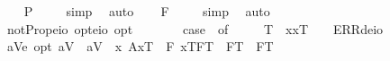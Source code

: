 \begin{isabellebody}
\ \isamarkupfalse%
\ {\isachardoublequoteopen}{\isacharbrackleft}{\isacharparenleft}\isactrlbold {\isasymexists}{\isasymphi}{\isachardot}\ {\isasymphi}\isactrlsup P{\isacharparenright}{\isacharbrackright}\ {\isacharequal}\ {\isasymtop}{\isachardoublequoteclose}%
\isadelimproof
\ %
\endisadelimproof
%
\isatagproof
{}\isamarkupfalse%
\ simp\ \isamarkupfalse%
\ auto%
\endisatagproof
{\isafoldproof}%
%
\isadelimproof
%
\endisadelimproof
\isanewline
\ \isamarkupfalse%
\ {\isachardoublequoteopen}{\isacharbrackleft}{\isacharparenleft}\isactrlbold {\isasymexists}{\isasymphi}{\isachardot}\ {\isasymphi}\isactrlsup F{\isacharparenright}{\isacharbrackright}\ {\isacharequal}\ {\isasymtop}{\isachardoublequoteclose}%
\isadelimproof
\ %
\endisadelimproof
%
\isatagproof
{}\isamarkupfalse%
\ simp\ \isamarkupfalse%
\ auto%
\endisatagproof
{\isafoldproof}%
%
\isadelimproof
%
\endisadelimproof
%
\isamarkuptrue%
\ \isamarkupfalse%
\ notProp{\isacharcolon}{\isacharcolon}{\isachardoublequoteopen}{\isacharparenleft}{\isacharparenleft}e{\isasymRightarrow}io{\isacharparenright}\ opt{\isacharparenright}{\isasymRightarrow}{\isacharparenleft}e{\isasymRightarrow}io{\isacharparenright}\ opt{\isachardoublequoteclose}\ {\isacharparenleft}{\isachardoublequoteopen}\isactrlbold {\isasymsim}{\isacharunderscore}{\isachardoublequoteclose}\ {\isacharbrackleft}{}{}{\isacharbrackright}\ {}{}{\isacharparenright}\ \ {\isachardoublequoteopen}\isactrlbold {\isasymsim}\ {\isasymPhi}\ {\isasymequiv}\ case\ {\isasymPhi}\ of\ \isanewline
\ \ \ \ T{\isacharparenleft}{\isasymPsi}{\isacharparenright}\ {\isasymRightarrow}\ \isactrlbold {\isasymlambda}x{\isachardot}\isactrlbold {\isasymnot}{\isasymlparr}{\isasymPhi}{\isacharcomma}x\isactrlsup T{\isasymrparr}\ {\isacharbar}\ {\isacharunderscore}\ {\isasymRightarrow}\ ERR{\isacharparenleft}deio{\isacharparenright}{\isachardoublequoteclose}%
\isamarkuptrue%
\ \isamarkupfalse%
\ a{\isacharunderscore}V{\isacharcolon}{\isacharcolon}{\isachardoublequoteopen}e\ opt{\isachardoublequoteclose}\ {\isacharparenleft}{\isachardoublequoteopen}\isactrlbold a\isactrlsub V{\isachardoublequoteclose}{\isacharparenright}\ \ {\isachardoublequoteopen}\isactrlbold a\isactrlsub V\ {\isasymequiv}\ \isactrlbold {\isasymiota}x{\isachardot}\ {\isacharparenleft}{\isasymlparr}A{\isacharbang}{\isacharcomma}x\isactrlsup T{\isasymrparr}\ \isactrlbold {\isasymand}\ {\isacharparenleft}\isactrlbold {\isasymforall}F{\isachardot}\ {\isasymlbrace}x\isactrlsup T{\isacharcomma}F\isactrlsup T{\isasymrbrace}\ \isactrlbold {\isasymequiv}\ {\isacharparenleft}F\isactrlsup T\ \isactrlbold {\isacharequal}\ F\isactrlsup T{\isacharparenright}{\isacharparenright}{\isacharparenright}{\isachardoublequoteclose}\isanewline

\end{isabellebody}
